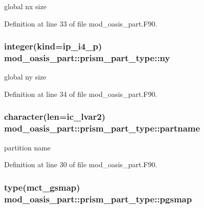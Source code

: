 global nx size 



Definition at line 33 of file mod\+\_\+oasis\+\_\+part.\+F90.

\hypertarget{structmod__oasis__part_1_1prism__part__type_a4169783dee96aa9c60d43826daf6000c}{
\subsubsection[{ny}]{\setlength{\rightskip}{0pt plus 5cm}integer(kind=ip\+\_\+i4\+\_\+p) mod\+\_\+oasis\+\_\+part\+::prism\+\_\+part\+\_\+type\+::ny\hspace{0.3cm}{\ttfamily [private]}}}\label{structmod__oasis__part_1_1prism__part__type_a4169783dee96aa9c60d43826daf6000c}


global ny size 



Definition at line 34 of file mod\+\_\+oasis\+\_\+part.\+F90.

\hypertarget{structmod__oasis__part_1_1prism__part__type_ae53180c23d73bf1f4930e24171dba0a2}{
\subsubsection[{partname}]{\setlength{\rightskip}{0pt plus 5cm}character(len=ic\+\_\+lvar2) mod\+\_\+oasis\+\_\+part\+::prism\+\_\+part\+\_\+type\+::partname\hspace{0.3cm}{\ttfamily [private]}}}\label{structmod__oasis__part_1_1prism__part__type_ae53180c23d73bf1f4930e24171dba0a2}


partition name 



Definition at line 30 of file mod\+\_\+oasis\+\_\+part.\+F90.

\hypertarget{structmod__oasis__part_1_1prism__part__type_ace66d3bf592452e56ffe202df3a09310}{
\subsubsection[{pgsmap}]{\setlength{\rightskip}{0pt plus 5cm}type(mct\+\_\+gsmap) mod\+\_\+oasis\+\_\+part\+::prism\+\_\+part\+\_\+type\+::pgsmap\hspace{0.3cm}{\ttfamily [private]}}}\label{structmod__oasis__part_1_1prism__part__type_ace66d3bf592452e56ffe202df3a09310}


